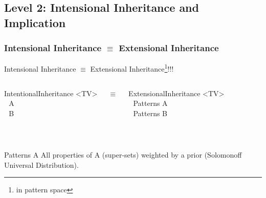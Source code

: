\documentclass{beamer}
\begin{document}
\subsection{Level 2: Intensional Inheritance and Implication}

\frame
{
  \frametitle{Intensional Inheritance $\equiv$ Extensional Inheritance}

  Intensional Inheritance $\equiv$ Extensional Inheritance\footnote{in
    pattern space}!!!\\[.5cm]

  \pause
  
  \begin{columns}
    \column{1.9in}

    IntentionalInheritance <TV>\\
    $\ \ \ $A\\
    $\ \ \ $B\\

    \column{.05in}
    
    $\equiv$
    
    \column{2in}
  
    ExtensionalInheritance <TV>\\
    $\ \ \ $Patterns A\\
    $\ \ \ $Patterns B\\
  \end{columns}

  $\ $\\[0.5cm]

  \begin{beamerboxesrounded}{Patterns A}
    All \alert{properties} of A (super-sets) weighted by a
    \alert{prior} (Solomonoff Universal Distribution).
  \end{beamerboxesrounded}

}

\iffalse
\end{document}
